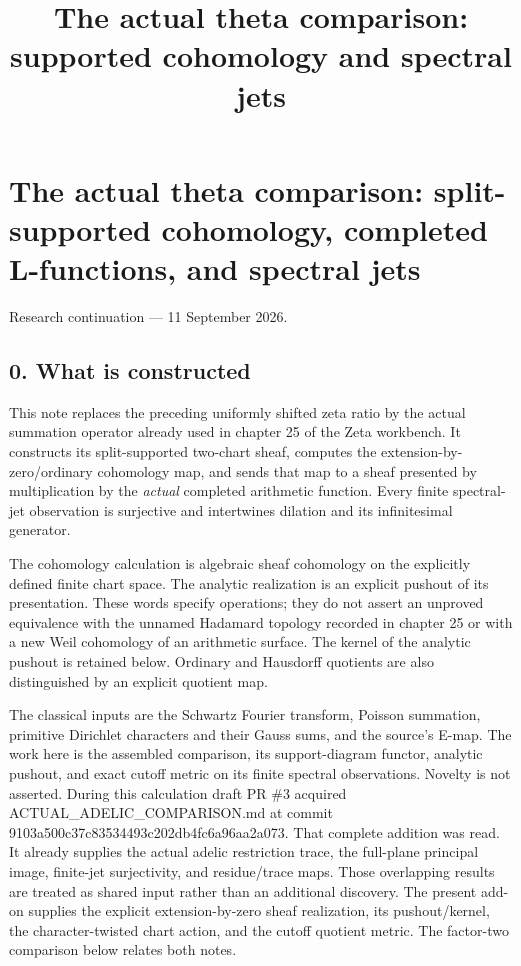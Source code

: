 \documentclass[
]{article}
\title{The actual theta comparison: supported cohomology and spectral
jets}
\author{}
\date{}
\begin{document}
\maketitle

{
\setcounter{tocdepth}{3}
\tableofcontents
}
\section{The actual theta comparison: split-supported cohomology,
completed L-functions, and spectral
jets}\label{the-actual-theta-comparison-split-supported-cohomology-completed-l-functions-and-spectral-jets}

Research continuation --- 11 September 2026.

\subsection{0. What is constructed}\label{what-is-constructed}

This note replaces the preceding uniformly shifted zeta ratio by the
actual summation operator already used in chapter 25 of the Zeta
workbench. It constructs its split-supported two-chart sheaf, computes
the extension-by-zero/ordinary cohomology map, and sends that map to a
sheaf presented by multiplication by the \emph{actual} completed
arithmetic function. Every finite spectral-jet observation is surjective
and intertwines dilation and its infinitesimal generator.

The cohomology calculation is algebraic sheaf cohomology on the
explicitly defined finite chart space. The analytic realization is an
explicit pushout of its presentation. These words specify operations;
they do not assert an unproved equivalence with the unnamed Hadamard
topology recorded in chapter 25 or with a new Weil cohomology of an
arithmetic surface. The kernel of the analytic pushout is retained
below. Ordinary and Hausdorff quotients are also distinguished by an
explicit quotient map.

The classical inputs are the Schwartz Fourier transform, Poisson
summation, primitive Dirichlet characters and their Gauss sums, and the
source's E-map. The work here is the assembled comparison, its
support-diagram functor, analytic pushout, and exact cutoff metric on
its finite spectral observations. Novelty is not asserted. During this
calculation draft PR \#3 acquired ACTUAL\_ADELIC\_COMPARISON.md at
commit 9103a500c37c83534493c202db4fc6a96aa2a073. That complete addition
was read. It already supplies the actual adelic restriction trace, the
full-plane principal image, finite-jet surjectivity, and residue/trace
maps. Those overlapping results are treated as shared input rather than
an additional discovery. The present add-on supplies the explicit
extension-by-zero sheaf realization, its pushout/kernel, the
character-twisted chart action, and the cutoff quotient metric. The
factor-two comparison below relates both notes.
\end{document}
